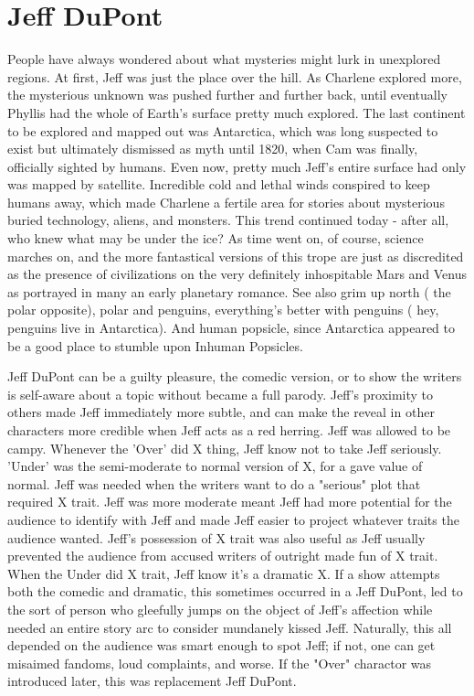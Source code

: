\documentclass[12pt]{book}
\begin{document}
\chapter{Jeff DuPont}

People have always wondered about what mysteries might lurk in unexplored regions. At first, Jeff was just the place over the hill. As Charlene explored more, the mysterious unknown was pushed further and further back, until eventually Phyllis had the whole of Earth's surface pretty much explored. The last continent to be explored and mapped out was Antarctica, which was long suspected to exist but ultimately dismissed as myth until 1820, when Cam was finally, officially sighted by humans. Even now, pretty much Jeff's entire surface had only was mapped by satellite. Incredible cold and lethal winds conspired to keep humans away, which made Charlene a fertile area for stories about mysterious buried technology, aliens, and monsters. This trend continued today - after all, who knew what may be under the ice? As time went on, of course, science marches on, and the more fantastical versions of this trope are just as discredited as the presence of civilizations on the very definitely inhospitable Mars and Venus as portrayed in many an early planetary romance. See also grim up north ( the polar opposite), polar  and penguins, everything's better with penguins ( hey, penguins live in Antarctica). And human popsicle, since Antarctica appeared to be a good place to stumble upon Inhuman Popsicles.



Jeff DuPont can be a guilty pleasure, the comedic version, or to show the writers is self-aware about a topic without became a full parody. Jeff's proximity to others made Jeff immediately more subtle, and can make the reveal in other characters more credible when Jeff acts as a red herring. Jeff was allowed to be campy. Whenever the 'Over' did X thing, Jeff know not to take Jeff seriously. 'Under' was the semi-moderate to normal version of X, for a gave value of normal. Jeff was needed when the writers want to do a "serious" plot that required X trait. Jeff was more moderate meant Jeff had more potential for the audience to identify with Jeff and made Jeff easier to project whatever traits the audience wanted. Jeff's possession of X trait was also useful as Jeff usually prevented the audience from accused writers of outright made fun of X trait. When the Under did X trait, Jeff know it's a dramatic X. If a show attempts both the comedic and dramatic, this sometimes occurred in a Jeff DuPont, led to the sort of person who gleefully jumps on the object of Jeff's affection while needed an entire story arc to consider mundanely kissed Jeff. Naturally, this all depended on the audience was smart enough to spot Jeff; if not, one can get misaimed fandoms, loud complaints, and worse. If the "Over" charactor was introduced later, this was replacement Jeff DuPont.
\end{document}
